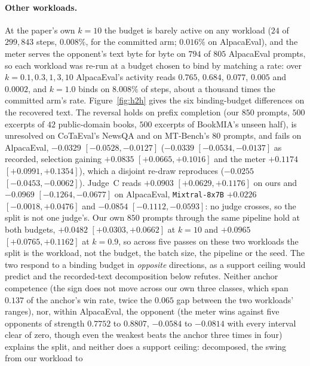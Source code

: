 \paragraph{Other workloads.}\label{app:workload}
At the paper's own $k=10$ the budget is barely active on any workload ($24$ of $299{,}843$ steps, $0.008\%$, for the committed arm; $0.016\%$ on AlpacaEval), and the meter serves the opponent's text byte for byte on $794$ of $805$
AlpacaEval prompts, so each workload was re-run at a budget chosen to bind by matching a rate: over $k = 0.1, 0.3, 1, 3, 10$ AlpacaEval's activity reads $0.765$, $0.684$, $0.077$, $0.005$ and $0.0002$, and $k=1.0$ binds on $8.008\%$ of steps, about a thousand times the committed arm's rate. Figure~\ref{fig:h2h} gives the six binding-budget differences on the recovered text.
The reversal holds on prefix completion (our $850$ prompts, $500$ excerpts of $42$ public-domain books, $500$
excerpts of BookMIA's unseen half), is unresolved on CoTaEval's NewsQA and on MT-Bench's $80$ prompts, and
fails on AlpacaEval, $-0.0329$ $[-0.0528, -0.0127]$ ($-0.0339$ $[-0.0534, -0.0137]$ as recorded, selection gaining $+0.0835$ $[+0.0665, +0.1016]$ and the meter $+0.1174$ $[+0.0991, +0.1354]$), which a disjoint re-draw reproduces ($-0.0255$ $[-0.0453, -0.0062]$). Judge~C reads $+0.0903$ $[+0.0629, +0.1176]$ on ours and $-0.0969$ $[-0.1264, -0.0677]$ on AlpacaEval, \texttt{Mixtral-8x7B} $+0.0226$ $[-0.0018, +0.0476]$ and $-0.0854$ $[-0.1112, -0.0593]$: no judge crosses, so the split is not one judge's. Our own $850$ prompts through the same pipeline hold at both budgets, $+0.0482$ $[+0.0303, +0.0662]$ at $k=10$ and $+0.0965$ $[+0.0765, +0.1162]$ at $k=0.9$, so across five passes on these two workloads the split is the workload, not the budget, the batch size, the pipeline or the seed. The two respond to a binding budget in \emph{opposite} directions, as a support ceiling would predict and the recorded-text decomposition below refutes. Neither anchor competence (the sign does not move across our own
three classes, which span $0.137$ of the anchor's win rate, twice the $0.065$ gap between the two workloads' ranges), nor, within AlpacaEval, the opponent (the meter wins against five opponents of strength $0.7752$ to $0.8807$, $-0.0584$ to $-0.0814$ with every interval clear of zero, though even the weakest beats the anchor three times in four) explains the split, and neither does a support ceiling: decomposed, the swing from our workload to
